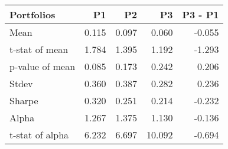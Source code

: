 \begin{tabular}{lrrrr}
\toprule
Portfolios & P1 & P2 & P3 & P3 - P1 \\
\midrule
Mean & 0.115 & 0.097 & 0.060 & -0.055 \\
t-stat of mean & 1.784 & 1.395 & 1.192 & -1.293 \\
p-value of mean & 0.085 & 0.173 & 0.242 & 0.206 \\
Stdev & 0.360 & 0.387 & 0.282 & 0.236 \\
Sharpe & 0.320 & 0.251 & 0.214 & -0.232 \\
Alpha & 1.267 & 1.375 & 1.130 & -0.136 \\
t-stat of alpha & 6.232 & 6.697 & 10.092 & -0.694 \\
\bottomrule
\end{tabular}
